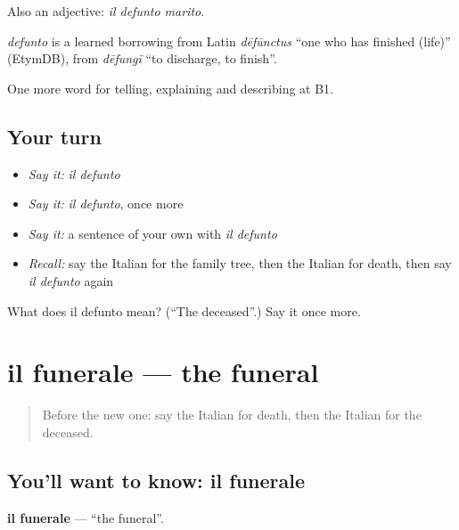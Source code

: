Also an adjective: \emph{il defunto marito}.

\begin{cousinweb}
\emph{defunto} is a learned borrowing from Latin \emph{dēfūnctus} \textquotedblleft{}one who has finished (life)\textquotedblright{} (EtymDB), from \emph{dēfungī} \textquotedblleft{}to discharge, to finish\textquotedblright{}.
\end{cousinweb}

\begin{grammarlens}[title={What you've built}]
One more word for telling, explaining and describing at B1.
\end{grammarlens}

\subsection*{Your turn}
\begin{itemize}
\raggedright
  \item \emph{Say it:} \emph{il defunto}
  \item \emph{Say it:} \emph{il defunto}, once more
  \item \emph{Say it:} a sentence of your own with \emph{il defunto}
  \item \emph{Recall:} say the Italian for the family tree, then the Italian for death, then say \emph{il defunto} again
\end{itemize}

\begin{tcolorbox}[breakable,colback=teal!4,colframe=teal!35!black,title={Before you move on}]
What does il defunto mean? (\textquotedblleft{}The deceased\textquotedblright{}.) Say it once more.
\end{tcolorbox}
\section[il funerale]{il funerale — the funeral}

\label{lesson:IT-C313-funerale}



\begin{quote}
Before the new one: say the Italian for death, then the Italian for the deceased.
\end{quote}

\subsection*{You'll want to know: il funerale}
\textbf{il funerale} — \textquotedblleft{}the funeral\textquotedblright{}.

